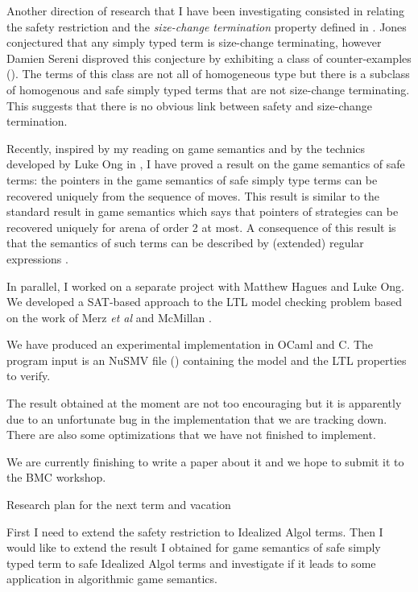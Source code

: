 \documentclass{article}
\begin{document}
\begin{list}
Another direction of research that I have been investigating
consisted in relating the safety restriction and the
\emph{size-change termination} property defined in
\cite{jones01,jones04}. Jones conjectured that any simply typed term
is size-change terminating, however Damien Sereni disproved this
conjecture by exhibiting a class of counter-examples
(\cite{serenistypesct05}). The terms of this class are not all of
homogeneous type but there is a subclass of homogenous and safe
simply typed terms that are not size-change terminating. This
suggests that there is no obvious link between safety and
size-change termination.


Recently, inspired by my reading on game semantics
\cite{abramsky:game-semantics} and by the technics developed by Luke
Ong in \cite{OngLics2006}, I have proved a result on the game
semantics of safe terms: the pointers in the game semantics of safe
simply type terms can be recovered uniquely from the sequence of
moves. This result is similar to the standard result in game
semantics which says that pointers of strategies can be recovered
uniquely for arena of order 2 at most. A consequence of this result
is that the semantics of such terms can be described by (extended)
regular expressions \cite{ghicamccusker00}.



In parallel, I worked on a separate project with Matthew Hagues and
Luke Ong. We developed a SAT-based approach to the LTL model
checking problem based on the work of Merz \emph{et al}
\cite{hammer:truly} and McMillan \cite{DBLP:conf/cav/McMillan03}.

We have produced an experimental implementation in OCaml and C. The
program input is an NuSMV file (\cite{CAV02:nusmv}) containing the
model and the LTL properties to verify.

The result obtained at the moment are not too encouraging but it is
apparently due to an unfortunate bug in the implementation that we
are tracking down. There are also some optimizations that we have
not finished to implement.

We are currently finishing to write a paper about it and we hope to
submit it to the BMC workshop.

\item[Research plan for the next term and vacation] \

First I need to extend the safety restriction to Idealized Algol
terms. Then I would like to extend the result I obtained for game
semantics of safe simply typed term to safe Idealized Algol terms
and investigate if it leads to some application in algorithmic game
semantics.



\end{list}
\end{document}
